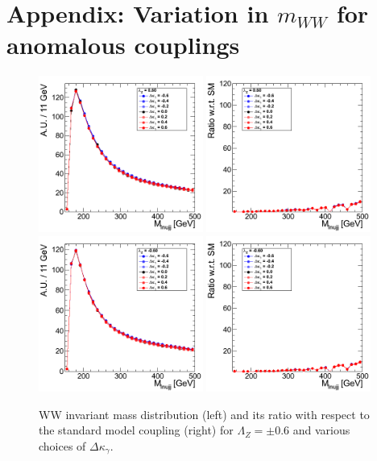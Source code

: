 \section{Appendix: Variation in \texorpdfstring{$m_{WW}$}{mWW} for anomalous couplings}
\begin{figure}[h!t]
  {\centering
    \includegraphics[width=0.48\textwidth]{figs/Mass4Body_060.png}
    \includegraphics[width=0.48\textwidth]{figs/Mass4Body_060_ratio.png}
    \includegraphics[width=0.48\textwidth]{figs/Mass4Body_m060.png}
    \includegraphics[width=0.48\textwidth]{figs/Mass4Body_m060_ratio.png}
    \caption{WW invariant mass distribution (left) and its ratio with respect to 
    the standard model coupling (right) for $\Lambda_Z = \pm 0.6$ and various choices of $\Delta{\kappa_\gamma}$.}
    \label{fig:ww_Mass4Body_atgcRatio06}}
\end{figure}
